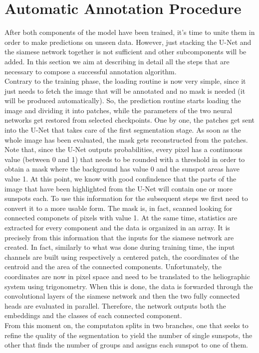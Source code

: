 \section{Automatic Annotation Procedure} \label{autoannotation}
After both components of the model have been trained, it's time to unite them in order to make predictions on unseen data. However, just stacking the U-Net and the siamese network together is not sufficient and other subcomponents will be added. In this section we aim at describing in detail all the steps that are necessary to compose a successful annotation algorithm.\\
Contrary to the training phase, the loading routine is now very simple, since it just needs to fetch the image that will be annotated and no mask is needed (it will be produced automatically). So, the prediction routine starts loading the image and dividing it into patches, while the parameters of the two neural networks get restored from selected checkpoints. One by one, the patches get sent into the U-Net that takes care of the first segmentation stage. As soon as the whole image has been evaluated, the mask gets reconstructed from the patches. Note that, since the U-Net outputs probabilities, every pixel has a continuous value (between 0 and 1) that needs to be rounded with a threshold in order to obtain a mask where the background has value 0 and the sunspot areas have value 1. At this point, we know with good confindence that the parts of the image that have been highlighted from the U-Net will contain one or more sunspots each. To use this information for the subsequent steps we first need to convert it to a more usable form. The mask is, in fact, scanned looking for connected componets of pixels with value 1. At the same time, statistics are extracted for every component and the data is organized in an array. It is precisely from this information that the inputs for the siamese network are created. In fact, similarly to what was done during training time, the input channels are built using respectively a centered patch, the coordinates of the centroid and the area of the connected components. Unfortunately, the coordinates are now in pixel space and need to be translated to the heliographic system using trigonometry. When this is done, the data is forwarded through the convolutional layers of the siamese network and then the two fully connected heads are evaluated in parallel. Therefore, the network outputs both the embeddings and the classes of each connected component.\\
From this moment on, the computaton splits in two branches, one that seeks to refine the quality of the segmentation to yield the number of single sunspots, the other that finds the number of groups and assigns each sunspot to one of them.
